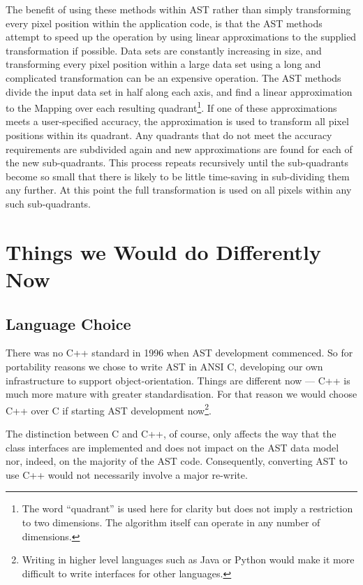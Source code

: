 \documentclass[final,authoryear,5p,times,twocolumn]{elsarticle}
\begin{document}
The benefit of using these methods within AST rather than simply
transforming every pixel position within the application code, is that
the AST methods attempt to speed up the operation by using linear
approximations to the supplied transformation if possible. Data sets are
constantly increasing in size, and transforming every pixel position
within a large data set using a long and complicated transformation can
be an expensive operation. The AST methods divide the input data set in
half along each axis, and find a linear approximation to the Mapping
over each resulting quadrant\footnote{The word ``quadrant'' is used here
for clarity but does not imply a restriction to two dimensions. The
algorithm itself can operate in any number of dimensions.}. If one of
these approximations meets a
user-specified accuracy, the approximation is used to transform all pixel positions
within its quadrant. Any quadrants that do not meet the accuracy
requirements are subdivided again and new approximations are found
for each of the new sub-quadrants. This process repeats recursively until
the sub-quadrants become so small that there is likely to be little
time-saving in sub-dividing them any further. At this point the full
transformation is used on all pixels within any such sub-quadrants.

\section{Things we Would do Differently Now}

\subsection{Language Choice}

There was no C++ standard in 1996 when AST development commenced.
So for portability reasons we chose to write AST in ANSI C, developing
our own infrastructure to support object-orientation. Things are
different now --- C++ is much more mature with greater standardisation.
For that reason we would choose C++ over C if starting AST development
now\footnote{Writing in higher level languages such as Java or Python would make
it more difficult to write interfaces for other languages.}.

The distinction between C and C++, of course, only affects the way that the
class interfaces are implemented and does not impact on the AST data model
nor, indeed, on the majority of the AST code. Consequently, converting AST
to use C++ would not necessarily involve a major re-write.
\end{document}
